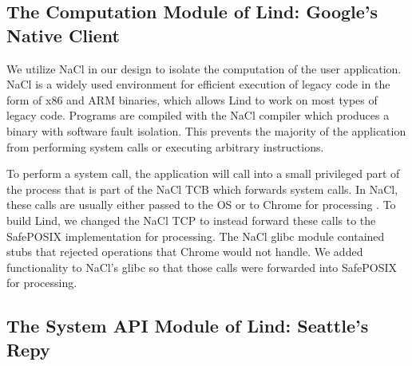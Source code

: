 \subsection{The Computation Module of Lind: Google's Native Client}

We utilize NaCl in our design to isolate the computation of the user application.  NaCl is a widely used environment for efficient  execution of legacy code in the form of x86 and ARM binaries, which allows Lind to work on most types of legacy code. Programs are compiled with the NaCl compiler which produces a binary with software fault isolation. This prevents the majority of the application from performing system calls  or executing arbitrary instructions. 

To perform a system call, the application will call into a small privileged
part of the process that is part of the NaCl TCB which forwards system calls.
 In NaCl, these calls are usually either passed to the OS or to Chrome for 
processing .  To build Lind, we changed the NaCl TCP to 
instead forward these calls to the SafePOSIX implementation
for processing.  The NaCl glibc module contained stubs that rejected operations
that Chrome would not handle.  We added functionality to NaCl's glibc so that
those calls were forwarded into SafePOSIX for processing.


%

\subsection{The System API Module of Lind: Seattle's Repy}

